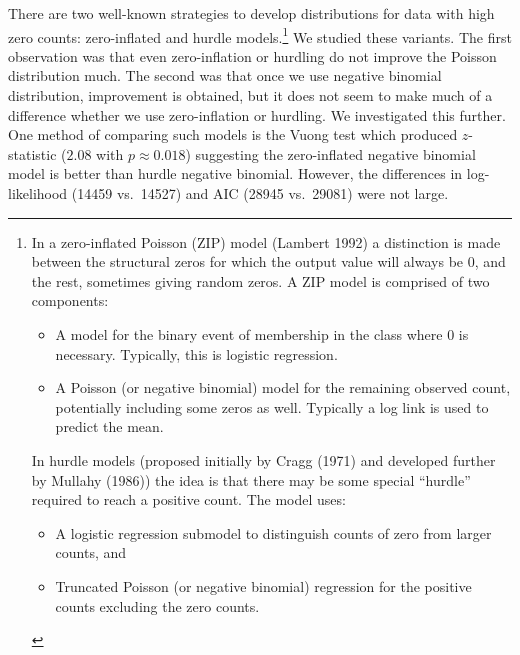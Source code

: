 \documentclass[
  10pt,
  dvipsnames]{scrartcl}
\begin{document}
There are two well-known strategies to develop distributions for data
with high zero counts: zero-inflated and hurdle
models.\footnote{In a zero-inflated Poisson (ZIP) model (Lambert 1992) a distinction is made between   the structural zeros for which the output value  will always be 0, and the rest, sometimes giving random zeros. A  ZIP model is comprised of two components:

\begin{itemize}
\item  A model for the binary event of membership in the class where 0 is necessary. Typically, this is logistic regression. 

\item  A Poisson (or negative binomial) model for the remaining observed count, potentially including some zeros as well. Typically a log link is used to predict the mean.
\end{itemize}


In hurdle models (proposed initially by Cragg (1971) and developed further by Mullahy (1986)) the idea  is that there may be some special  “hurdle” required to reach a positive count. The model  uses:

\begin{itemize}
\item A logistic regression  submodel to distinguish counts of zero from larger counts, and
\item  Truncated Poisson (or negative binomial) regression for the positive counts  excluding the zero counts.
\end{itemize}} We studied these variants. The first observation was that
even zero-inflation or hurdling do not improve the Poisson distribution
much. The second was that once we use negative binomial distribution,
improvement is obtained, but it does not seem to make much of a
difference whether we use zero-inflation or hurdling. We investigated
this further. One method of comparing such models is the Vuong test
which produced \(z\)-statistic (\(2.08\) with \(p\approx 0.018\))
suggesting the zero-inflated negative binomial model is better than
hurdle negative binomial. However, the differences in log-likelihood
(14459 vs.~14527) and AIC (28945 vs.~29081) were not large.

\footnotesize

\normalsize

\footnotesize

\normalsize

\footnotesize
\end{document}
